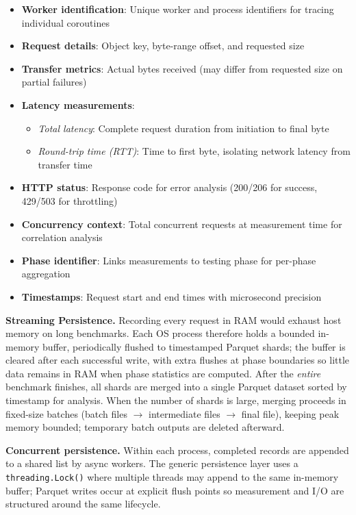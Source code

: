 \begin{itemize}
    \item \textbf{Worker identification}: Unique worker and process identifiers for tracing individual coroutines
    \item \textbf{Request details}: Object key, byte-range offset, and requested size
    \item \textbf{Transfer metrics}: Actual bytes received (may differ from requested size on partial failures)
    \item \textbf{Latency measurements}:
    \begin{itemize}
        \item \textit{Total latency}: Complete request duration from initiation to final byte
        \item \textit{Round-trip time (RTT)}: Time to first byte, isolating network latency from transfer time
    \end{itemize}
    \item \textbf{HTTP status}: Response code for error analysis (200/206 for success, 429/503 for throttling)
    \item \textbf{Concurrency context}: Total concurrent requests at measurement time for correlation analysis
    \item \textbf{Phase identifier}: Links measurements to testing phase for per-phase aggregation
    \item \textbf{Timestamps}: Request start and end times with microsecond precision
\end{itemize}

\textbf{Streaming Persistence.}
Recording every request in RAM would exhaust host memory on long benchmarks.
Each OS process therefore holds a bounded in-memory buffer, periodically flushed to timestamped Parquet shards; the buffer is cleared after each successful write, with extra flushes at phase boundaries so little data remains in RAM when phase statistics are computed.
After the \emph{entire} benchmark finishes, all shards are merged into a single Parquet dataset sorted by timestamp for analysis.
When the number of shards is large, merging proceeds in fixed-size batches (batch files $\rightarrow$ intermediate files $\rightarrow$ final file), keeping peak memory bounded; temporary batch outputs are deleted afterward.

\textbf{Concurrent persistence.}
Within each process, completed records are appended to a shared list by async workers.
The generic persistence layer uses a \texttt{threading.Lock()} where multiple threads may append to the same in-memory buffer; Parquet writes occur at explicit flush points so measurement and I/O are structured around the same lifecycle.

